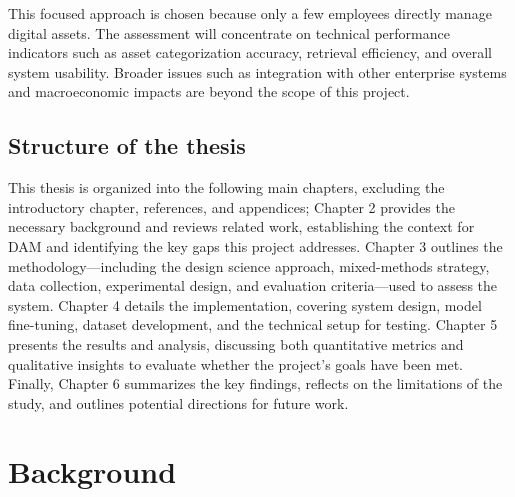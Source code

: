 \documentclass[a4paper,10pt,twocolumn]{article}
\numberwithin{figure}{section}
\numberwithin{table}{section}
\begin{document}
This focused approach is chosen because only a few employees directly manage digital assets.
The assessment will concentrate on technical performance indicators such as asset categorization accuracy, 
retrieval efficiency, and overall system usability. Broader issues such as integration with other enterprise systems 
and macroeconomic impacts are beyond the scope of this project.

\subsection{Structure of the thesis}

This thesis is organized into the following main chapters, 
excluding the introductory chapter, references, and appendices; 
Chapter 2 provides the necessary background and reviews related work,
 establishing the context for DAM and identifying the key gaps this project addresses. 
 Chapter 3 outlines the methodology—including the design science approach, 
 mixed-methods strategy, data collection, experimental design, and evaluation 
 criteria—used to assess the system. 
 Chapter 4 details the implementation, covering system design, 
 model fine-tuning, dataset development, and the technical setup for testing. 
 Chapter 5 presents the results and analysis, discussing both quantitative 
 metrics and qualitative insights to evaluate whether the project’s goals have been met. 
 Finally, Chapter 6 summarizes the key findings, reflects on the limitations of the study, 
 and outlines potential directions for future work.




\newpage
\section{Background}
\end{document}
